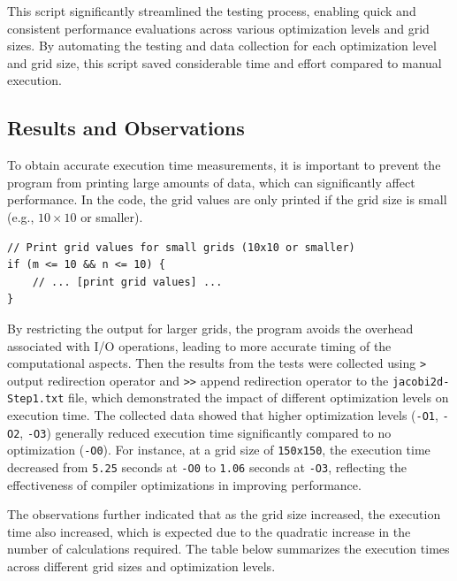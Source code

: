 \documentclass{article}
\begin{document}
This script significantly streamlined the testing process, enabling quick and consistent performance evaluations across various optimization levels and grid sizes. By automating the testing and data collection for each optimization level and grid size, this script saved considerable time and effort compared to manual execution.

\subsection{Results and Observations}

To obtain accurate execution time measurements, it is important to prevent the program from printing large amounts of data, which can significantly affect performance. In the code, the grid values are only printed if the grid size is small (e.g., $10\times10$ or smaller).

\begin{lstlisting}[style=CStyle, caption={Printing Grid Values for Small Grids}]
// Print grid values for small grids (10x10 or smaller)
if (m <= 10 && n <= 10) {
    // ... [print grid values] ...
}
\end{lstlisting}

By restricting the output for larger grids, the program avoids the overhead associated with I/O operations, leading to more accurate timing of the computational aspects. Then the results from the tests were collected using \texttt{>} output redirection operator and \texttt{>>} append redirection operator to the \texttt{jacobi2d-Step1.txt} file, which demonstrated the impact of different optimization levels on execution time. The collected data showed that higher optimization levels (\texttt{-O1}, \texttt{-O2}, \texttt{-O3}) generally reduced execution time significantly compared to no optimization (\texttt{-O0}). For instance, at a grid size of \texttt{150x150}, the execution time decreased from \texttt{5.25} seconds at \texttt{-O0} to \texttt{1.06} seconds at \texttt{-O3}, reflecting the effectiveness of compiler optimizations in improving performance.

The observations further indicated that as the grid size increased, the execution time also increased, which is expected due to the quadratic increase in the number of calculations required. The table below summarizes the execution times across different grid sizes and optimization levels.
\end{document}
